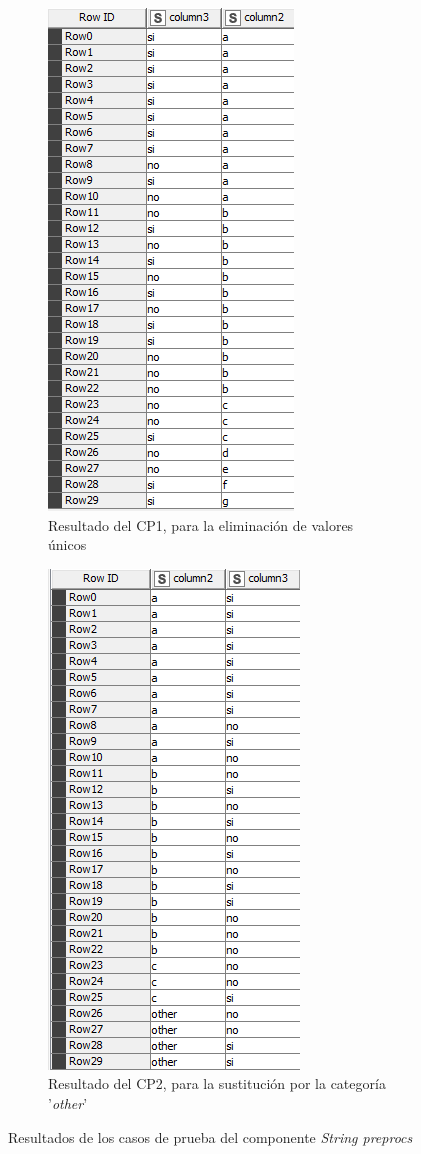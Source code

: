 \begin{figure}[H]
	\centering
	\begin{subfigure}[b]{0.45\linewidth}
		\centering
		\includegraphics[width=0.45\linewidth]{"figuras/capi 3/pruebas-jenn/resultado-cp1-string-prep"}
		\caption{Resultado del CP1, para la eliminación de valores únicos}
		\label{fig:resultado-cp1-string-prep}
	\end{subfigure}
	\hspace{0.5cm}
	\begin{subfigure}[b]{0.45\linewidth}
		\centering
		\includegraphics[width=0.45\linewidth]{"figuras/capi 3/pruebas-jenn/resultado-cp2-string-prep"}
		\caption{Resultado del CP2, para la sustitución por la categoría '\textit{other}'}
		\label{fig:resultado-cp2-string-prep}
	\end{subfigure}
	\caption{Resultados de los casos de prueba del componente \textit{String preprocs}}
	\label{fig:resultado-cp-string-preprocs}
\end{figure}


